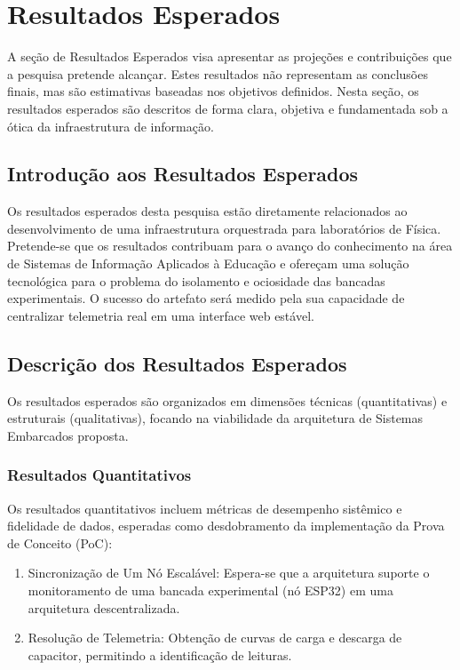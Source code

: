 \chapter{Resultados Esperados}
A seção de Resultados Esperados visa apresentar as projeções e contribuições que a pesquisa pretende alcançar. Estes resultados não representam as conclusões finais, mas são estimativas baseadas nos objetivos definidos. Nesta seção, os resultados esperados são descritos de forma clara, objetiva e fundamentada sob a ótica da infraestrutura de informação.

\section{Introdução aos Resultados Esperados}
Os resultados esperados desta pesquisa estão diretamente relacionados ao desenvolvimento de uma infraestrutura orquestrada para laboratórios de Física. Pretende-se que os resultados contribuam para o avanço do conhecimento na área de Sistemas de Informação Aplicados à Educação e ofereçam uma solução tecnológica para o problema do isolamento e ociosidade das bancadas experimentais. O sucesso do artefato será medido pela sua capacidade de centralizar telemetria real em uma interface web estável.

\section{Descrição dos Resultados Esperados}
Os resultados esperados são organizados em dimensões técnicas (quantitativas) e estruturais (qualitativas), focando na viabilidade da arquitetura de Sistemas Embarcados proposta.

\subsection{Resultados Quantitativos}
Os resultados quantitativos incluem métricas de desempenho sistêmico e fidelidade de dados, esperadas como desdobramento da implementação da Prova de Conceito (PoC):
\begin{enumerate}
	\item Sincronização de Um Nó Escalável: Espera-se que a arquitetura suporte o monitoramento de uma bancada experimental (nó ESP32) em uma arquitetura descentralizada.
	\item Resolução de Telemetria: Obtenção de curvas de carga e descarga de capacitor, permitindo a identificação de leituras.
\end{enumerate}

